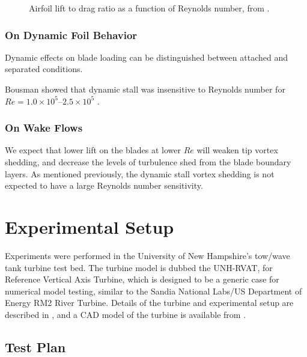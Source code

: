 \documentclass[energies,article,accept,moreauthors,pdftex,12pt,a4paper]{mdpi}
\begin{document}
\begin{figure}[ht]
\caption{Airfoil lift to drag ratio as a function of Reynolds number, from 
\cite{McMasters1980}.}
\end{figure}

\subsubsection{On Dynamic Foil Behavior}

Dynamic effects on blade loading can be distinguished between attached and
separated conditions. 

Bousman showed that dynamic stall was insensitive to Reynolds number for $Re=1.0
\times 10^5$--$2.5 \times 10^5$ \cite{Bousman2000-evaluation}.

\subsubsection{On Wake Flows}

We expect that lower lift on the blades at lower $Re$ will weaken tip vortex
shedding, and decrease the levels of turbulence shed from the blade boundary
layers. As mentioned previously, the dynamic stall vortex shedding is not
expected to have a large Reynolds number sensitivity.


\section{Experimental Setup}

Experiments were performed in the University of New Hampshire's tow/wave tank
turbine test bed. The turbine model is dubbed the UNH-RVAT, for Reference
Vertical Axis Turbine, which is designed to be a generic case for numerical
model testing, similar to the Sandia National Labs/US Department of Energy RM2
River Turbine. Details of the turbine and experimental setup are described in
\cite{Bachant2015-JoT}, and a CAD model of the turbine is available from
\cite{Bachant2014-RVAT-CAD}.



\subsection{Test Plan} 
\end{document}
